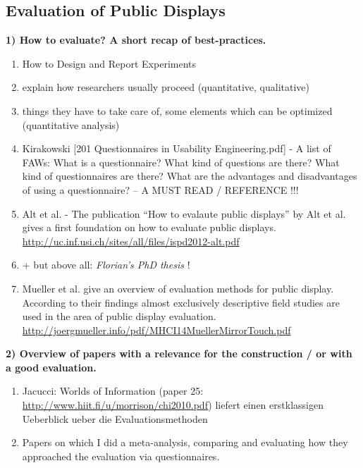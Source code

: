 \subsection{Evaluation of Public Displays}


	\textbf{1) How to evaluate? A short recap of best-practices.}

		\begin{enumerate}
		\item How to Design and Report Experiments \cite{field2003design}
		\item explain how researchers usually proceed (quantitative, qualitative)
		\item things they have to take care of, some elements which can be optimized (quantitative analysis)


		\item Kirakowski [201 Questionnaires in Usability Engineering.pdf] - A list of FAWs: What is a questionnaire? What kind of questions are there? What kind of questionnaires are there? What are the advantages and disadvantages of using a questionnaire? 		--   A MUST READ / REFERENCE !!!



		\item Alt et al. \cite{Alt2012HowToEvaluate}  -  The publication ``How to evalaute public displays'' by Alt et al. gives a first foundation on how to evaluate public displays. \url{http://uc.inf.usi.ch/sites/all/files/ispd2012-alt.pdf} %
		\item + but above all: \textit{Florian's PhD thesis} \cite{alt2013thesis}!

		\item Mueller et al. \cite{muller2014mirrortouch} give an overview of evaluation methods for public display. According to their findings almost exclusively descriptive field studies are used in the area of public display evaluation. \url{http://joergmueller.info/pdf/MHCI14MuellerMirrorTouch.pdf}

		\end{enumerate}




	\textbf{2) Overview of papers with a relevance for the construction / or with a good evaluation.}

		\begin{enumerate}
		\item Jacucci: Worlds of Information (paper 25: \url{http://www.hiit.fi/u/morrison/chi2010.pdf}) liefert einen erstklassigen Ueberblick ueber die Evaluationsmethoden
		\item Papers on which I did a meta-analysis, comparing and evaluating how they approached the evaluation via questionnaires.
	\end{enumerate}






